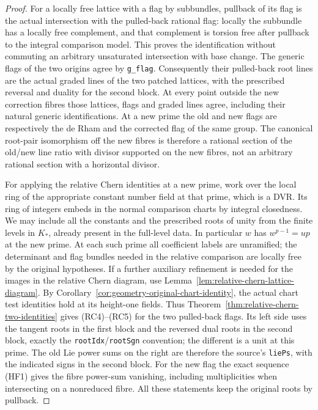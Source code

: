 \begin{proof}
For a locally free lattice with a flag by subbundles,
pullback of its flag is the actual intersection with the
pulled-back rational flag: locally the subbundle has a
locally free complement, and that complement is torsion
free after pullback to the integral comparison model.
This proves the identification without commuting an
arbitrary unsaturated intersection with base change.
The generic flags of the two origins agree by
\texttt{g\_flag}. Consequently their pulled-back root
lines are the actual graded lines of the two patched
lattices, with the prescribed reversal and duality for
the second block. At every point outside the new
correction fibres those lattices, flags and graded lines
agree, including their natural generic identifications.
At a new prime the old and new flags are respectively
the de Rham and the corrected flag of the same group.
The canonical root-pair isomorphism off the new fibres
is therefore a rational section of the old/new line ratio
with divisor supported on the new fibres, not an
arbitrary rational section with a horizontal divisor.

For applying the relative Chern identities at a new prime,
work over the local ring of the appropriate constant
number field at that prime, which is a DVR. Its ring of
integers embeds in the normal comparison charts by
integral closedness. We may include all the constants
and the prescribed roots of unity from the finite levels
in \(K_*\), already present in the full-level data.
In particular \(w\) has \(w^{p-1}=up\) at the new prime.
At each such prime all coefficient labels are unramified;
the determinant and flag bundles needed in the relative
comparison are locally free by the original hypotheses.
If a further auxiliary refinement is needed for the
images in the relative Chern diagram, use
Lemma~\ref{lem:relative-chern-lattice-diagram}.
By Corollary~\ref{cor:geometry-original-chart-identity},
the actual chart test identities hold at its height-one
fields. Thus Theorem~\ref{thm:relative-chern-two-identities}
gives (RC4)--(RC5) for the two pulled-back flags.
Its left side uses the tangent roots in the first block
and the reversed dual roots in the second block, exactly
the \texttt{rootIdx}/\texttt{rootSgn} convention; the
different is a unit at this prime. The old Lie power
sums on the right are therefore the source's
\texttt{liePs}, with the indicated signs in the
second block. For the new flag the exact sequence (HF1)
gives the fibre power-sum vanishing, including
multiplicities when intersecting on a nonreduced fibre.
All these statements keep the original roots by pullback.


\end{proof}
